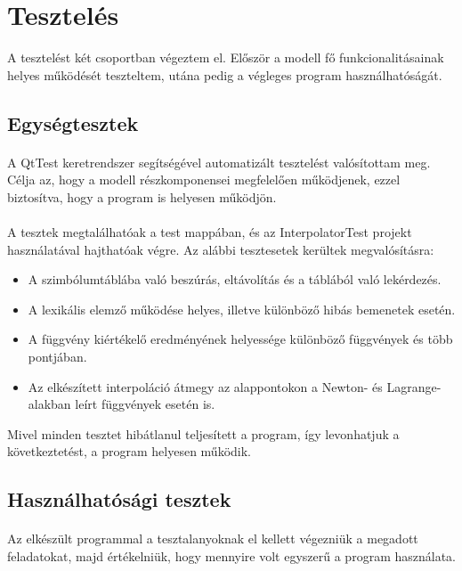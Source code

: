 \documentclass[12pt]{report}
\begin{document}
\section{Tesztelés}
A tesztelést két csoportban végeztem el. Először a modell fő funkcionalitásainak helyes működését teszteltem, utána pedig a végleges program használhatóságát.

\subsection{Egységtesztek}
\paragraph{}
A QtTest keretrendszer segítségével automatizált tesztelést valósítottam meg. Célja az, hogy a modell részkomponensei megfelelően működjenek, ezzel biztosítva, hogy a program is helyesen működjön.
\paragraph{}
A tesztek megtalálhatóak a test mappában, és az InterpolatorTest projekt használatával hajthatóak végre. Az alábbi tesztesetek kerültek megvalósításra:
\begin{itemize}
\item A szimbólumtáblába való beszúrás, eltávolítás és a táblából való lekérdezés.
\item A lexikális elemző működése helyes, illetve különböző hibás bemenetek esetén.
\item A függvény kiértékelő eredményének helyessége különböző függvények és több pontjában.
\item Az elkészített interpoláció átmegy az alappontokon a Newton- és Lagrange-alakban leírt függvények esetén is.
\end{itemize}
Mivel minden tesztet hibátlanul teljesített a program, így levonhatjuk a következtetést, a program helyesen működik.

\subsection{Használhatósági tesztek}
\paragraph{}
Az elkészült programmal a tesztalanyoknak el kellett végezniük a megadott feladatokat, majd értékelniük, hogy mennyire volt egyszerű a program használata.
\end{document}
